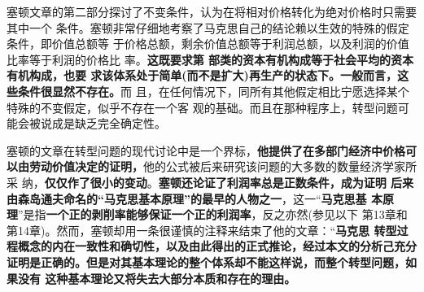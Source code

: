 塞顿文章的第二部分探讨了不变条件，认为在将相对价格转化为绝对价格时只需要其中一个
条件。塞顿非常仔细地考察了马克思自己的结论赖以生效的特殊的假定条件，即价值总额等
于价格总额，剩余价值总额等于利润总额，以及利润的价值比率等于利润的价格比
率。\textbf{这既要求第 部类的资本有机构成等于社会平均的资本有机构成，也要
  求该体系处于简单(而不是扩大)再生产的状态下。一般而言，这些条件很显然不存在。}而
且，在任何情况下，同所有其他假定相比宁愿选择某个特殊的不变假定，似乎不存在一个客
观的基础。而且在那种程序上，转型问题可能会被说成是缺乏完全确定性。

塞顿的文章在转型问题的现代讨论中是一个界标，\textbf{他提供了在多部门经济中价格可
  以由劳动价值决定的证明，}他的公式被后来研究该问题的大多数的数量经济学家所采
纳，\textbf{仅仅作了很小的变动}。\textbf{塞顿还论证了利润率总是正数条件，成为证明
  后来由森岛通夫命名的“马克思基本原理”的最早的人物之一}，这一“\textbf{马克思基
  本原理}”是指\textbf{一个正的剥削率能够保证一个正的利润率}，反之亦然(参见以下
第13章和第14章)。然而，塞顿却用一条很谨慎的注释来结束了他的文章：“\textbf{马克思
  转型过程概念的内在一致性和确切性，以及由此得出的正式推论，经过本文的分析己充分
  证明是正确的。但是对其基本理论的整个体系却不能这样说，而整个转型问题，如果没有
  这种基本理论又将失去大部分本质和存在的理由。}

